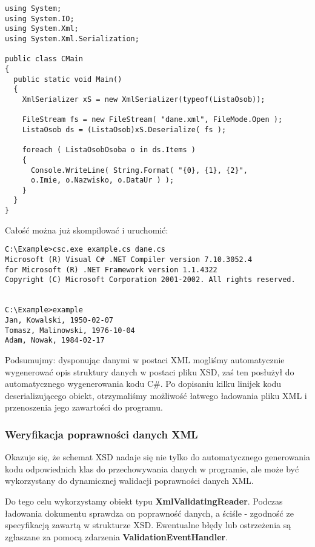 \begin{scriptsize}
\begin{verbatim}
using System;
using System.IO;
using System.Xml;
using System.Xml.Serialization;

public class CMain
{
  public static void Main()
  {
    XmlSerializer xS = new XmlSerializer(typeof(ListaOsob));

    FileStream fs = new FileStream( "dane.xml", FileMode.Open );
    ListaOsob ds = (ListaOsob)xS.Deserialize( fs );

    foreach ( ListaOsobOsoba o in ds.Items )
    {  
      Console.WriteLine( String.Format( "{0}, {1}, {2}", 
      o.Imie, o.Nazwisko, o.DataUr ) );
    }
  }
}
\end{verbatim}
\end{scriptsize}

Całość można już skompilować i uruchomić:

\begin{scriptsize}
\begin{verbatim}
C:\Example>csc.exe example.cs dane.cs
Microsoft (R) Visual C# .NET Compiler version 7.10.3052.4
for Microsoft (R) .NET Framework version 1.1.4322
Copyright (C) Microsoft Corporation 2001-2002. All rights reserved.


C:\Example>example
Jan, Kowalski, 1950-02-07
Tomasz, Malinowski, 1976-10-04
Adam, Nowak, 1984-02-17
\end{verbatim}
\end{scriptsize}

Podsumujmy: dysponując danymi w postaci XML mogliśmy automatycznie wygenerować opis struktury danych w postaci
pliku XSD, zaś ten posłużył do automatycznego wygenerowania kodu C\#. Po dopisaniu kilku linijek kodu
deserializującego obiekt, otrzymaliśmy możliwość łatwego ładowania pliku XML i przenoszenia jego
zawartości do programu. 

\subsubsection{Weryfikacja poprawności danych XML}

Okazuje się, że schemat XSD nadaje się nie tylko do automatycznego generowania kodu odpowiednich klas do
przechowywania danych w programie, ale może być wykorzystany do dynamicznej walidacji poprawności danych XML.

Do tego celu wykorzystamy obiekt typu {\bf XmlValidatingReader}. Podczas ładowania dokumentu sprawdza on
poprawność danych, a ściśle - zgodność ze specyfikacją zawartą w strukturze XSD. Ewentualne błędy
lub ostrzeżenia są zgłaszane za pomocą zdarzenia {\bf ValidationEventHandler}. 

